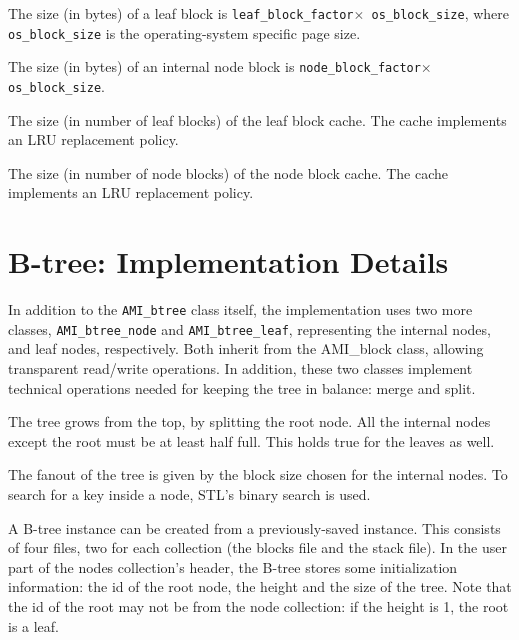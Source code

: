    {The size (in bytes) of a leaf block
  is {\tt leaf\_block\_factor$\times$ os\_block\_size}, where {\tt
  os\_block\_size} is the operating-system specific page size.}

   {The size (in bytes) of an internal
  node block is {\tt node\_block\_factor$\times$ os\_block\_size}.}

   {The size (in number of leaf blocks) of
  the leaf block cache. The cache implements an LRU replacement policy.}

   {The size (in number of node blocks) of
  the node block cache. The cache implements an LRU replacement policy.}

\etabb
{}

\chapter{B-tree: Implementation Details}
In addition to the {\tt AMI\_btree} class itself, the implementation uses two
more classes, {\tt AMI\_btree\_node} and {\tt AMI\_btree\_leaf}, representing
the internal nodes, and leaf nodes, respectively. Both inherit from
the AMI\_block class, allowing transparent read/write operations. In
addition, these two classes implement technical operations needed for
keeping the tree in balance: merge and split. 

The tree grows from the top, by splitting the root node. All the
internal nodes except the root must be at least half full. This holds
true for the leaves as well.

The fanout of the tree is given by the block size chosen for the
internal nodes. To search for a key inside a node, STL's binary search
is used.

A B-tree instance can be created from a previously-saved instance. This
consists of four files, two for each collection (the blocks file and
the stack file). In the user part of the nodes collection's header,
the B-tree stores some initialization information: the id of the root
node, the height and the size of the tree. Note that the id of the
root may not be
from the node collection: if the height is 1, the root is a leaf.


